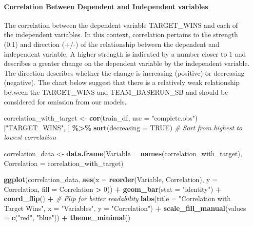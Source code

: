 \documentclass[
]{article}
\newenvironment{Shaded}{\begin{snugshade}}{\end{snugshade}}
\newcommand{\AttributeTok}[1]{\textcolor[rgb]{0.13,0.29,0.53}{#1}}
\newcommand{\CommentTok}[1]{\textcolor[rgb]{0.56,0.35,0.01}{\textit{#1}}}
\newcommand{\ConstantTok}[1]{\textcolor[rgb]{0.56,0.35,0.01}{#1}}
\newcommand{\DecValTok}[1]{\textcolor[rgb]{0.00,0.00,0.81}{#1}}
\newcommand{\FunctionTok}[1]{\textcolor[rgb]{0.13,0.29,0.53}{\textbf{#1}}}
\newcommand{\NormalTok}[1]{#1}
\newcommand{\OtherTok}[1]{\textcolor[rgb]{0.56,0.35,0.01}{#1}}
\newcommand{\SpecialCharTok}[1]{\textcolor[rgb]{0.81,0.36,0.00}{\textbf{#1}}}
\newcommand{\StringTok}[1]{\textcolor[rgb]{0.31,0.60,0.02}{#1}}
\begin{document}
\paragraph{Correlation Between Dependent and Independent
variables}\label{correlation-between-dependent-and-independent-variables}

The correlation between the dependent variable TARGET\_WINS and each of
the independent variables. In this context, correlation pertains to the
strength (0:1) and direction (+/-) of the relationship between the
dependent and independent variable. A higher strength is indicated by a
number closer to 1 and describes a greater change on the dependent
variable by the independent variable. The direction describes whether
the change is increasing (positive) or decreasing (negative). The chart
below suggest that there is a relatively weak relationship between the
TARGET\_WINS and TEAM\_BASERUN\_SB and should be considered for omission
from our models.

\begin{Shaded}
\begin{Highlighting}[]
\NormalTok{correlation\_with\_target }\OtherTok{\textless{}{-}} \FunctionTok{cor}\NormalTok{(train\_df, }\AttributeTok{use =} \StringTok{"complete.obs"}\NormalTok{)[}\StringTok{"TARGET\_WINS"}\NormalTok{, ] }\SpecialCharTok{\%\textgreater{}\%}
  \FunctionTok{sort}\NormalTok{(}\AttributeTok{decreasing =} \ConstantTok{TRUE}\NormalTok{)  }\CommentTok{\# Sort from highest to lowest correlation}

\NormalTok{correlation\_data }\OtherTok{\textless{}{-}} \FunctionTok{data.frame}\NormalTok{(}\AttributeTok{Variable =} \FunctionTok{names}\NormalTok{(correlation\_with\_target), }\AttributeTok{Correlation =}\NormalTok{ correlation\_with\_target)}

\FunctionTok{ggplot}\NormalTok{(correlation\_data, }\FunctionTok{aes}\NormalTok{(}\AttributeTok{x =} \FunctionTok{reorder}\NormalTok{(Variable, Correlation), }\AttributeTok{y =}\NormalTok{ Correlation, }\AttributeTok{fill =}\NormalTok{ Correlation }\SpecialCharTok{\textgreater{}} \DecValTok{0}\NormalTok{)) }\SpecialCharTok{+}
  \FunctionTok{geom\_bar}\NormalTok{(}\AttributeTok{stat =} \StringTok{"identity"}\NormalTok{) }\SpecialCharTok{+}
  \FunctionTok{coord\_flip}\NormalTok{() }\SpecialCharTok{+}  \CommentTok{\# Flip for better readability}
  \FunctionTok{labs}\NormalTok{(}\AttributeTok{title =} \StringTok{"Correlation with Target Wins"}\NormalTok{, }\AttributeTok{x =} \StringTok{"Variables"}\NormalTok{, }\AttributeTok{y =} \StringTok{"Correlation"}\NormalTok{) }\SpecialCharTok{+}
  \FunctionTok{scale\_fill\_manual}\NormalTok{(}\AttributeTok{values =} \FunctionTok{c}\NormalTok{(}\StringTok{"red"}\NormalTok{, }\StringTok{"blue"}\NormalTok{)) }\SpecialCharTok{+}
  \FunctionTok{theme\_minimal}\NormalTok{()}
\end{Highlighting}
\end{Shaded}
\end{document}
